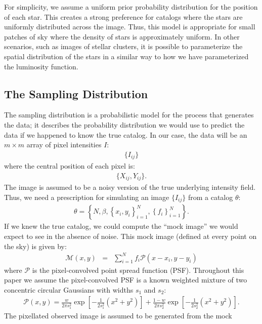 \documentclass[manuscript]{aastex}
\begin{document}
For simplicity, we assume a uniform prior probability distribution for the
position of each star. This creates a strong preference for catalogs where
the stars are uniformly distributed across the image. Thus, this model is
appropriate for small patches of sky where the density of stars is approximately
uniform. In other scenarios, such as images of stellar clusters, it is possible
to parameterize the spatial distribution of the stars in a similar way to how
we have parameterized the luminosity function.

\subsection{The Sampling Distribution}
The sampling distribution is a probabilistic model for the process that
generates the data; it describes the probability distribution we would use
to predict the data if we happened to know the true catalog. In our case,
the data will be an $m \times m$ array of pixel intensities $I$:
\begin{eqnarray}
\{I_{ij}\}
\end{eqnarray}
where the central position of each pixel is:
\begin{eqnarray}
\{X_{ij}, Y_{ij}\}.
\end{eqnarray}
The image is assumed to be a noisy version of the true underlying intensity
field. Thus, we need
a prescription for simulating an image $\{I_{ij}\}$ from a catalog $\theta$:
\begin{eqnarray}
\theta = \left\{N, \beta, \left\{x_i, y_i\right\}_{i=1}^N, 
\left\{f_i\right\}_{i=1}^N\right\}.
\end{eqnarray}
If we knew the true catalog, we could compute the
``mock image'' we would expect to see
in the absence of noise. This mock image (defined at every point on the sky)
is given by:
\begin{eqnarray}
\mathcal{M}(x, y) &=& \sum_{i=1}^N f_i \mathcal{P}(x - x_i, y - y_i)
\end{eqnarray}
where $\mathcal{P}$ is the pixel-convolved point spread function (PSF).
Throughout this paper we
assume the pixel-convolved PSF is a known weighted mixture of two concentric
circular
Gaussians with widths $s_1$ and $s_2$:
\begin{eqnarray}
\mathcal{P}(x, y) = \frac{w}{2\pi s_1^2}\exp
\left[
-\frac{1}{2s_1^2}\left(x^2 + y^2\right)
\right]
+ \frac{1-w}{2\pi s_2^2}\exp
\left[-\frac{1}{2s_2^2}\left(x^2 + y^2\right)
\right].
\end{eqnarray}
The pixellated observed image is assumed to be generated from the mock
\end{document}
